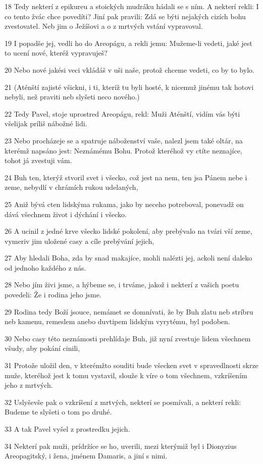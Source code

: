 \par 18 Tedy nekterí z epikureu a stoických mudráku hádali se s ním. A nekterí rekli: I co tento žvác chce povedíti? Jiní pak pravili: Zdá se býti nejakých cizích bohu zvestovatel. Neb jim o Ježíšovi a o z mrtvých vstání vypravoval.
\par 19 I popadše jej, vedli ho do Areopágu, a rekli jemu: Mužeme-li vedeti, jaké jest to ucení nové, kteréž vypravuješ?
\par 20 Nebo nové jakési veci vkládáš v uši naše, protož chceme vedeti, co by to bylo.
\par 21 (Aténští zajisté všickni, i ti, kteríž tu byli hosté, k nicemuž jinému tak hotovi nebyli, než praviti neb slyšeti neco nového.)
\par 22 Tedy Pavel, stoje uprostred Areopágu, rekl: Muži Aténští, vidím vás býti všelijak príliš nábožné lidi.
\par 23 Nebo procházeje se a spatruje náboženství vaše, nalezl jsem také oltár, na kterémž napsáno jest: Neznámému Bohu. Protož kteréhož vy ctíte neznajíce, tohot já zvestuji vám.
\par 24 Buh ten, kterýž stvoril svet i všecko, což jest na nem, ten jsa Pánem nebe i zeme, nebydlí v chrámích rukou udelaných,
\par 25 Aniž bývá cten lidskýma rukama, jako by neceho potreboval, ponevadž on dává všechnem život i dýchání i všecko.
\par 26 A ucinil z jedné krve všecko lidské pokolení, aby prebývalo na tvári vší zeme, vymeriv jim uložené casy a cíle prebývání jejich,
\par 27 Aby hledali Boha, zda by snad makajíce, mohli nalézti jej, ackoli není daleko od jednoho každého z nás.
\par 28 Nebo jím živi jsme, a hýbeme se, i trváme, jakož i nekterí z vašich poetu povedeli: Že i rodina jeho jsme.
\par 29 Rodina tedy Boží jsouce, nemámet se domnívati, že by Buh zlatu neb stríbru neb kamenu, remeslem anebo duvtipem lidským vyrytému, byl podoben.
\par 30 Nebo casy této neznámosti prehlídaje Buh, již nyní zvestuje lidem všechnem všudy, aby pokání cinili,
\par 31 Protože uložil den, v kterémžto souditi bude všecken svet v spravedlnosti skrze muže, kteréhož jest k tomu vystavil, slouže k víre o tom všechnem, vzkríšením jeho z mrtvých.
\par 32 Uslyševše pak o vzkríšení z mrtvých, nekterí se posmívali, a nekterí rekli: Budeme te slyšeti o tom po druhé.
\par 33 A tak Pavel vyšel z prostredku jejich.
\par 34 Nekterí pak muži, prídržíce se ho, uverili, mezi kterýmiž byl i Dionyzius Areopagitský, i žena, jménem Damaris, a jiní s nimi.

